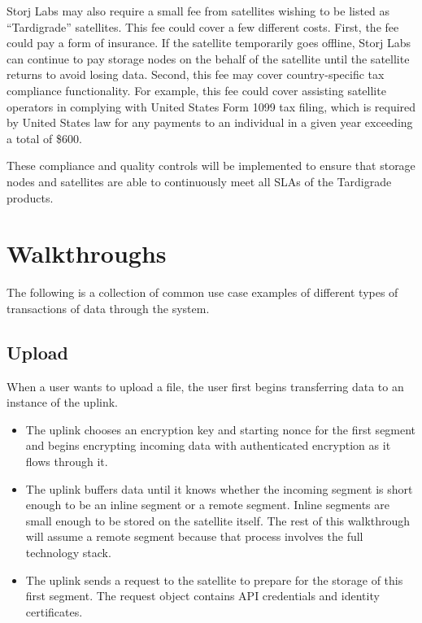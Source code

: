 \documentclass[11pt,fleqn,openany]{book}
\begin{document}
Storj Labs may also require a small fee from satellites wishing to be listed
as ``Tardigrade'' satellites. This fee could cover a few different costs. First,
the fee could pay a form of insurance. If the satellite temporarily goes
offline, Storj Labs can continue to pay storage nodes on the behalf of the
satellite until the satellite returns to avoid losing data. Second, this fee
may cover country-specific tax compliance functionality. For example, this fee
could cover assisting satellite operators in complying with United States
Form 1099 tax filing, which is required by United States law for any payments
to an individual in a given year exceeding a total of \$600.

These compliance and quality controls will be implemented to ensure that
storage nodes and satellites are able to continuously meet all SLAs of the
Tardigrade products.

\chapter{Walkthroughs}\label{chap:walkthroughs}

The following is a collection of common use case examples of different types of
transactions of data through the system.

\section{Upload}

When a user wants to upload a file, the user first begins transferring data to
an instance of the uplink.

\begin{itemize}
\item The uplink chooses an encryption key and starting nonce for
  the first segment and begins encrypting incoming data with authenticated
  encryption as it flows through it.
\item The uplink buffers data until it knows whether the incoming segment is
short enough to be an inline segment or a remote segment. Inline segments are
small enough to be stored on the satellite itself. The rest of this
walkthrough will assume a remote segment because that process involves the
full technology stack.
\item The uplink sends a request to the satellite to prepare for the storage
of this first segment. The request object contains API credentials and identity
certificates.
\end{itemize}
\end{document}
